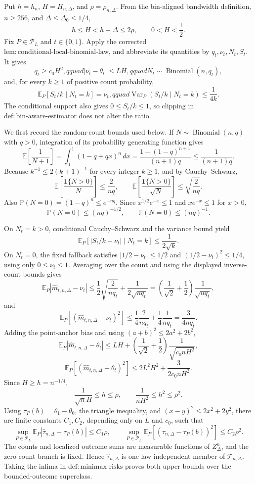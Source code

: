 Put \(h=h_n\), \(H=H_{n,\Delta}\), and \(\rho=\rho_{n,\Delta}\).  From the bin-aligned bandwidth definition, \(n\geq256\), and \(\Delta\leq\Delta_0\leq1/4\),
\[
 h\leq H<h+\Delta\leq2\rho,
 \qquad 0<H<\frac12.
\]
Fix \(P\in\mathcal P_L\) and \(t\in\{0,1\}\).  Apply the corrected \(\mathrm{lem:conditional\text{-}local\text{-}binomial\text{-}law}\), and abbreviate its quantities by \(q_t,\nu_t,N_t,S_t\).  It gives
\[
 q_t\geq c_0H^2,qquad |\nu_t-\theta_t|\leq LH,qquad
 N_t\sim\operatorname{Binomial}(n,q_t),
\]
and, for every \(k\geq1\) of positive count probability,
\[
 \mathbb E_P[S_t/k\mid N_t=k]=\nu_t,qquad
 \operatorname{Var}_P(S_t/k\mid N_t=k)\leq\frac1{4k}.
\]
The conditional support also gives \(0\leq S_t/k\leq1\), so clipping in \(\mathrm{def:bin\text{-}aware\text{-}estimator}\) does not alter the ratio.

We first record the random-count bounds used below.  If \(N\sim\operatorname{Binomial}(n,q)\) with \(q>0\), integration of its probability generating function gives
\[
 \mathbb E\!\left[\frac1{N+1}\right]
 =\int_0^1(1-q+qx)^n\,dx
 =\frac{1-(1-q)^{n+1}}{(n+1)q}
 \leq\frac1{(n+1)q}.
\]
Because \(k^{-1}\leq2(k+1)^{-1}\) for every integer \(k\geq1\), and by Cauchy--Schwarz,
\[
 \mathbb E\!\left[\frac{\mathbf1\{N>0\}}N\right]\leq\frac2{nq},
 \qquad
 \mathbb E\!\left[\frac{\mathbf1\{N>0\}}{\sqrt N}\right]
 \leq\sqrt{\frac2{nq}}.
\]
Also \(\mathbb P(N=0)=(1-q)^n\leq e^{-nq}\).  Since \(x^{1/2}e^{-x}\leq1\) and \(xe^{-x}\leq1\) for \(x>0\),
\[
 \mathbb P(N=0)\leq(nq)^{-1/2},
 \qquad
 \mathbb P(N=0)\leq(nq)^{-1}.
\]

On \(N_t=k>0\), conditional Cauchy--Schwarz and the variance bound yield
\[
 \mathbb E_P[|S_t/k-\nu_t|\mid N_t=k]\leq\frac1{2\sqrt k}.
\]
On \(N_t=0\), the fixed fallback satisfies \(|1/2-\nu_t|\leq1/2\) and \((1/2-\nu_t)^2\leq1/4\), using only \(0\leq\nu_t\leq1\).  Averaging over the count and using the displayed inverse-count bounds gives
\[
 \mathbb E_P|\widehat m_{t,n,\Delta}-\nu_t|
 \leq\frac12\sqrt{\frac2{nq_t}}+\frac1{2\sqrt{nq_t}}
 =\left(\frac1{\sqrt2}+\frac12\right)\frac1{\sqrt{nq_t}},
\]
and
\[
 \mathbb E_P[(\widehat m_{t,n,\Delta}-\nu_t)^2]
 \leq\frac14\frac2{nq_t}+\frac14\frac1{nq_t}
 =\frac3{4nq_t}.
\]
Adding the point-anchor bias and using \((a+b)^2\leq2a^2+2b^2\),
\[
 \mathbb E_P|\widehat m_{t,n,\Delta}-\theta_t|
 \leq LH+\left(\frac1{\sqrt2}+\frac12\right)\frac1{\sqrt{c_0nH^2}},
\]
\[
 \mathbb E_P[(\widehat m_{t,n,\Delta}-\theta_t)^2]
 \leq2L^2H^2+\frac3{2c_0nH^2}.
\]
Since \(H\geq h=n^{-1/4}\),
\[
 \frac1{\sqrt nH}\leq h\leq\rho,
 \qquad
 \frac1{nH^2}\leq h^2\leq\rho^2.
\]
Using \(\tau_P(b)=\theta_1-\theta_0\), the triangle inequality, and \((x-y)^2\leq2x^2+2y^2\), there are finite constants \(C_1,C_2\), depending only on \(L\) and \(c_0\), such that
\[
 \sup_{P\in\mathcal P_L}\mathbb E_P|\widehat\tau_{n,\Delta}-\tau_P(b)|\leq C_1\rho,
 \qquad
 \sup_{P\in\mathcal P_L}\mathbb E_P[(\widehat\tau_{n,\Delta}-\tau_P(b))^2]\leq C_2\rho^2.
\]
The counts and localized outcome sums are measurable functions of \(Z_\Delta^n\), and the zero-count branch is fixed.  Hence \(\widehat\tau_{n,\Delta}\) is one law-independent member of \(\mathcal T_{n,\Delta}\).  Taking the infima in \(\mathrm{def:minimax\text{-}risks}\) proves both upper bounds over the bounded-outcome superclass.

